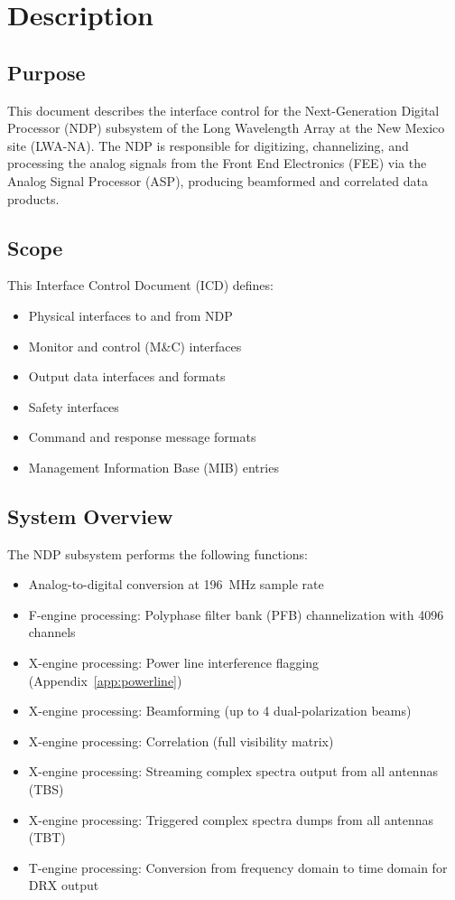 
\chapter{Description}
\label{sec:description}

\section{Purpose}

This document describes the interface control for the Next-Generation Digital Processor (NDP) subsystem of the Long Wavelength Array at the New Mexico site (LWA-NA). The NDP is responsible for digitizing, channelizing, and processing the analog signals from the Front End Electronics (FEE) via the Analog Signal Processor (ASP), producing beamformed and correlated data products.

\section{Scope}

This Interface Control Document (ICD) defines:
\begin{itemize}
    \item Physical interfaces to and from NDP
    \item Monitor and control (M\&C) interfaces
    \item Output data interfaces and formats
    \item Safety interfaces
    \item Command and response message formats
    \item Management Information Base (MIB) entries
\end{itemize}

\section{System Overview}

The NDP subsystem performs the following functions:
\begin{itemize}
    \item Analog-to-digital conversion at 196~MHz sample rate
    \item F-engine processing: Polyphase filter bank (PFB) channelization with 4096 channels
    \item X-engine processing: Power line interference flagging (Appendix~\ref{app:powerline})
    \item X-engine processing: Beamforming (up to 4 dual-polarization beams)
    \item X-engine processing: Correlation (full visibility matrix)
    \item X-engine processing: Streaming complex spectra output from all antennas (TBS)
    \item X-engine processing: Triggered complex spectra dumps from all antennas (TBT)
    \item T-engine processing: Conversion from frequency domain to time domain for DRX output
\end{itemize}

